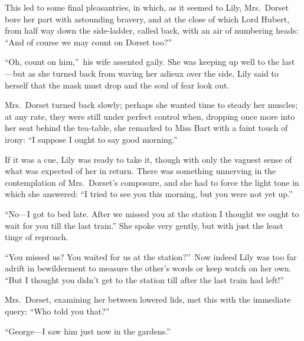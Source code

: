 \documentclass[12pt,a4paper]{book}
\begin{document}
This led to some final pleasantries, in which, as it seemed to
Lily, Mrs.\ Dorset bore her part with astounding bravery, and at
the close of which Lord Hubert, from half way down the
side-ladder, called back, with an air of numbering heads: ``And of
course we may count on Dorset too?''





``Oh, count on him,''\ his wife assented gaily. She was keeping up
well to the last---but as she turned back from waving her adieux
over the side, Lily said to herself that the mask must drop and
the soul of fear look out.





Mrs.\ Dorset turned back slowly; perhaps she wanted time to steady
her muscles; at any rate, they were still under perfect control
when, dropping once more into her seat behind the tea-table, she
remarked to Miss Bart with a faint touch of irony: ``I suppose I
ought to say good morning.''





If it was a cue, Lily was ready to take it, though with only the
vaguest sense of what was expected of her in return. There was
something unnerving in the contemplation of Mrs.\ Dorset's
composure, and she had to force the light tone in which she
answered: ``I tried to see you this morning, but you were not yet
up.''





``No---I got to bed late. After we missed you at the station
I thought we ought to wait for you till the last train.'' 
She spoke very gently, but with just the least tinge of reproach.





``You missed us? You waited for us at the station?''\ Now indeed
Lily was too far adrift in bewilderment to measure the other's
words or keep watch on her own. ``But I thought you didn't get to
the station till after the last train had left!''





Mrs.\ Dorset, examining her between lowered lids, met this with
the immediate query: ``Who told you that?''





``George---I saw him just now in the gardens.''
\end{document}
